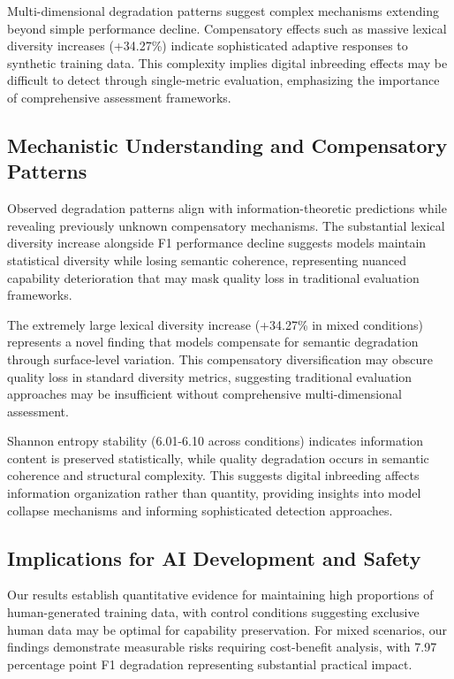 \documentclass{article}
\begin{document}
Multi-dimensional degradation patterns suggest complex mechanisms extending beyond simple performance decline. Compensatory effects such as massive lexical diversity increases (+34.27\%) indicate sophisticated adaptive responses to synthetic training data. This complexity implies digital inbreeding effects may be difficult to detect through single-metric evaluation, emphasizing the importance of comprehensive assessment frameworks.

\subsection{Mechanistic Understanding and Compensatory Patterns}

Observed degradation patterns align with information-theoretic predictions while revealing previously unknown compensatory mechanisms. The substantial lexical diversity increase alongside F1 performance decline suggests models maintain statistical diversity while losing semantic coherence, representing nuanced capability deterioration that may mask quality loss in traditional evaluation frameworks.

The extremely large lexical diversity increase (+34.27\% in mixed conditions) represents a novel finding that models compensate for semantic degradation through surface-level variation. This compensatory diversification may obscure quality loss in standard diversity metrics, suggesting traditional evaluation approaches may be insufficient without comprehensive multi-dimensional assessment.

Shannon entropy stability (6.01-6.10 across conditions) indicates information content is preserved statistically, while quality degradation occurs in semantic coherence and structural complexity. This suggests digital inbreeding affects information organization rather than quantity, providing insights into model collapse mechanisms and informing sophisticated detection approaches.

\subsection{Implications for AI Development and Safety}

Our results establish quantitative evidence for maintaining high proportions of human-generated training data, with control conditions suggesting exclusive human data may be optimal for capability preservation. For mixed scenarios, our findings demonstrate measurable risks requiring cost-benefit analysis, with 7.97 percentage point F1 degradation representing substantial practical impact.
\end{document}
